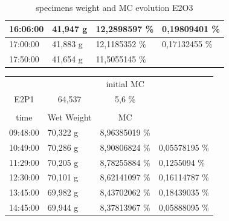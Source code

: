 \begin{table}[]
\begin{tabular}{llll}
		\multicolumn{1}{|l|}{16:06:00} & \multicolumn{1}{l|}{41,947 g} & \multicolumn{1}{l|}{12,2898597   \%} & \multicolumn{1}{l|}{0,19809401 \%} \\ \hline
		\multicolumn{1}{|l|}{17:00:00} & \multicolumn{1}{l|}{41,883 g} & \multicolumn{1}{l|}{12,1185352   \%} & \multicolumn{1}{l|}{0,17132455 \%} \\ \hline
		\multicolumn{1}{|l|}{17:50:00} & \multicolumn{1}{l|}{41,654 g} & \multicolumn{1}{l|}{11,5055145   \%} &  \\ \cline{1-3}
	\end{tabular}
	\caption{specimens weight and MC evolution E2O3}
	\label{tab:Tab6}
\end{table}
\begin{table}[]
	\centering
	\begin{tabular}{llll}
		\cline{3-3}
		& \multicolumn{1}{l|}{} & \multicolumn{1}{c|}{initial MC} &  \\ \cline{1-3}
		\multicolumn{1}{|c|}{\cellcolor[HTML]{C65911}E2P1} & \multicolumn{1}{c|}{\cellcolor[HTML]{C65911}64,537} & \multicolumn{1}{c|}{5,6 \%} &  \\ \cline{1-3}
		&  &  &  \\ \cline{1-3}
		\multicolumn{1}{|c|}{\cellcolor[HTML]{C0C0C0}time} & \multicolumn{1}{c|}{\cellcolor[HTML]{C0C0C0}Wet Weight} & \multicolumn{1}{c|}{\cellcolor[HTML]{C0C0C0}MC} &  \\ \cline{1-3}
		\multicolumn{1}{|l|}{09:48:00} & \multicolumn{1}{l|}{70,322 g} & \multicolumn{1}{l|}{8,96385019   \%} &  \\ \hline
		\multicolumn{1}{|l|}{10:49:00} & \multicolumn{1}{l|}{70,286 g} & \multicolumn{1}{l|}{8,90806824   \%} & \multicolumn{1}{l|}{0,05578195 \%} \\ \hline
		\multicolumn{1}{|l|}{11:29:00} & \multicolumn{1}{l|}{70,205 g} & \multicolumn{1}{l|}{8,78255884   \%} & \multicolumn{1}{l|}{0,1255094 \%} \\ \hline
		\multicolumn{1}{|l|}{12:30:00} & \multicolumn{1}{l|}{70,101 g} & \multicolumn{1}{l|}{8,62141097   \%} & \multicolumn{1}{l|}{0,16114787 \%} \\ \hline
		\multicolumn{1}{|l|}{13:45:00} & \multicolumn{1}{l|}{69,982 g} & \multicolumn{1}{l|}{8,43702062   \%} & \multicolumn{1}{l|}{0,18439035 \%} \\ \hline
		\multicolumn{1}{|l|}{14:45:00} & \multicolumn{1}{l|}{69,944 g} & \multicolumn{1}{l|}{8,37813967   \%} & \multicolumn{1}{l|}{0,05888095 \%} \\ \hline

\end{tabular}
\end{table}
